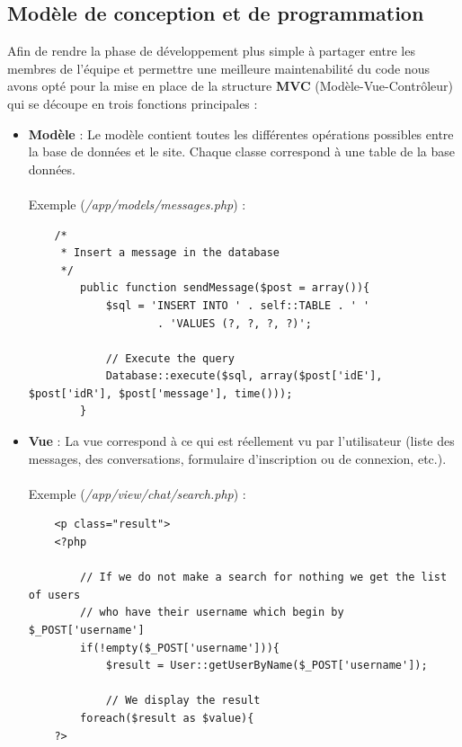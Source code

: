 \documentclass[12pt,a4paper]{report}
\begin{document}
\subsection{Modèle de conception et de programmation}
Afin de rendre la phase de développement plus simple à partager entre les membres de l'équipe et permettre une meilleure maintenabilité du code nous avons opté pour la mise en place de la structure \textbf{MVC} (Modèle-Vue-Contrôleur) qui se découpe en trois fonctions principales : 

\begin{itemize}
    \item \textbf{Modèle} : Le modèle contient toutes les différentes opérations possibles entre la base de données et le site. Chaque classe correspond à une table de la base données.
        \paragraph{} 
        Exemple (\textit{/app/models/messages.php}) :
        \lstset{langage = php}
        
        \begin{lstlisting}
    /*
     * Insert a message in the database
     */
        public function sendMessage($post = array()){
            $sql = 'INSERT INTO ' . self::TABLE . ' '
                    . 'VALUES (?, ?, ?, ?)';
            
            // Execute the query
            Database::execute($sql, array($post['idE'], $post['idR'], $post['message'], time()));
        }
        \end{lstlisting}
        \clearpage
    \item \textbf{Vue} : La vue correspond à ce qui est réellement vu par l'utilisateur (liste des messages, des conversations, formulaire d'inscription ou de connexion, etc.).
    \paragraph{}
    Exemple (\textit{/app/view/chat/search.php}) :
    \lstset{}
    \begin{lstlisting}
    <p class="result">
    <?php
        
        // If we do not make a search for nothing we get the list of users
        // who have their username which begin by $_POST['username']
        if(!empty($_POST['username'])){
            $result = User::getUserByName($_POST['username']);
            
            // We display the result
        foreach($result as $value){
    ?>
    

\end{lstlisting}
\end{itemize}
\end{document}
